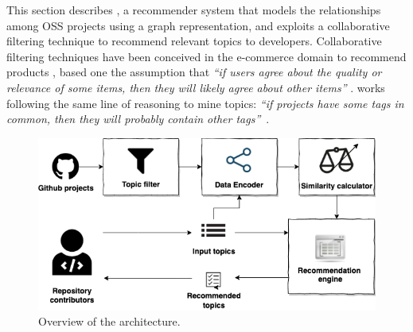 This section describes \TF, %
a recommender system %
that models the relationships among OSS projects using a graph representation, and exploits a collaborative filtering technique \cite{Schafer:2007:CFR:1768197.1768208} to recommend relevant \GH topics to developers. Collaborative filtering techniques have been conceived in the e-commerce domain %
to recommend products %
\cite{Linden:2003:ARI:642462.642471}, based one the assumption that \emph{``if users agree about the quality or relevance of some items, then they will likely agree about other items''} \cite{Schafer:2007:CFR:1768197.1768208}. 
\TF works %
following the same line of reasoning to mine \GH topics: \emph{``if projects have some tags in common, then they will probably contain other tags''}~\cite{NGUYEN2020110460}.

\begin{figure}[t!]
	\centering
	\includegraphics[width=\linewidth]{figs/TopFilter.png}
	\caption{Overview of the \TF architecture.}%
	\label{fig:TopFilterArchitecture}
\end{figure}



